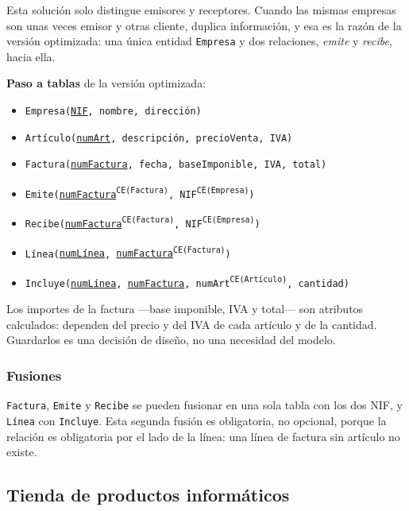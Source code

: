 Esta solución solo distingue emisores y receptores. Cuando las mismas empresas
son unas veces emisor y otras cliente, duplica información, y esa es la razón de
la versión optimizada: una única entidad \texttt{Empresa} y dos relaciones,
\emph{emite} y \emph{recibe}, hacia ella.

\textbf{Paso a tablas} de la versión optimizada:

\begin{itemize}[leftmargin=*]
    \item \texttt{Empresa(\underline{NIF}, nombre, dirección)}
    \item \texttt{Artículo(\underline{numArt}, descripción, precioVenta, IVA)}
    \item \texttt{Factura(\underline{numFactura}, fecha, baseImponible, IVA,
          total)}
    \item \texttt{Emite(\underline{numFactura}\textsuperscript{CE(Factura)},
          NIF\textsuperscript{CE(Empresa)})}
    \item \texttt{Recibe(\underline{numFactura}\textsuperscript{CE(Factura)},
          NIF\textsuperscript{CE(Empresa)})}
    \item \texttt{Línea(\underline{numLínea},
          \underline{numFactura}\textsuperscript{CE(Factura)})}
    \item \texttt{Incluye(\underline{numLínea}, \underline{numFactura},
          numArt\textsuperscript{CE(Artículo)}, cantidad)}
\end{itemize}

Los importes de la factura —base imponible, IVA y total— son atributos
calculados: dependen del precio y del IVA de cada artículo y de la cantidad.
Guardarlos es una decisión de diseño, no una necesidad del modelo.

\subsubsection*{Fusiones}

\texttt{Factura}, \texttt{Emite} y \texttt{Recibe} se pueden fusionar en una
sola tabla con los dos NIF, y \texttt{Línea} con \texttt{Incluye}. Esta segunda
fusión es obligatoria, no opcional, porque la relación es obligatoria por el
lado de la línea: una línea de factura sin artículo no existe.

\subsection{Tienda de productos informáticos}

